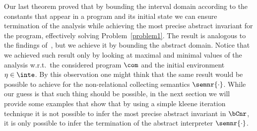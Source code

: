 
Our last theorem proved that by bounding the interval domain according
to the constants that appear in a program and its initial state we can
ensure termination of the analysis while achieving the most precise
abstract invariant for the program, effectively solving
Problem~\ref{problem1}. The result is analogous to the findings
of~\cite{Gawlitza2009}, but we achieve it by bounding the abstract
domain. Notice that we achieved such result only by looking at maximal
and minimal values of the analysis w.r.t.\ the considered program
\(\com\) and the initial environment \(\eta \in \inte\). By this
observation one might think that the same result would be possible to
achieve for the non-relational collecting semantics
\(\semnr{\cdot}\). While our guess is that such thing should be
possible, in the next section we will provide some examples that show
that by using a simple kleene iteration technique it is not possible
to infer the most precise abstract invariant in \(\bCnr\), it is only
possible to infer the termination of the abstract interpreter
\(\semnr{\cdot}\).

